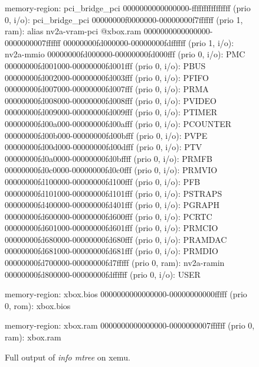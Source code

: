 \begin{figure}
\begin{minipage}{0.48\linewidth}
\begin{ffcode}
    memory-region: pci_bridge_pci
      0000000000000000-ffffffffffffffff (prio 0, i/o): pci_bridge_pci
        00000000f0000000-00000000f7ffffff (prio 1, ram): alias nv2a-vram-pci @xbox.ram 0000000000000000-0000000007ffffff
        00000000fd000000-00000000fdffffff (prio 1, i/o): nv2a-mmio
          00000000fd000000-00000000fd000fff (prio 0, i/o): PMC
          00000000fd001000-00000000fd001fff (prio 0, i/o): PBUS
          00000000fd002000-00000000fd003fff (prio 0, i/o): PFIFO
          00000000fd007000-00000000fd007fff (prio 0, i/o): PRMA
          00000000fd008000-00000000fd008fff (prio 0, i/o): PVIDEO
          00000000fd009000-00000000fd009fff (prio 0, i/o): PTIMER
          00000000fd00a000-00000000fd00afff (prio 0, i/o): PCOUNTER
          00000000fd00b000-00000000fd00bfff (prio 0, i/o): PVPE
          00000000fd00d000-00000000fd00dfff (prio 0, i/o): PTV
          00000000fd0a0000-00000000fd0bffff (prio 0, i/o): PRMFB
          00000000fd0c0000-00000000fd0c0fff (prio 0, i/o): PRMVIO
          00000000fd100000-00000000fd100fff (prio 0, i/o): PFB
          00000000fd101000-00000000fd101fff (prio 0, i/o): PSTRAPS
          00000000fd400000-00000000fd401fff (prio 0, i/o): PGRAPH
          00000000fd600000-00000000fd600fff (prio 0, i/o): PCRTC
          00000000fd601000-00000000fd601fff (prio 0, i/o): PRMCIO
          00000000fd680000-00000000fd680fff (prio 0, i/o): PRAMDAC
          00000000fd681000-00000000fd681fff (prio 0, i/o): PRMDIO
          00000000fd700000-00000000fd7fffff (prio 0, ram): nv2a-ramin
          00000000fd800000-00000000fdffffff (prio 0, i/o): USER

    memory-region: xbox.bios
      0000000000000000-00000000000fffff (prio 0, rom): xbox.bios

    memory-region: xbox.ram
      0000000000000000-0000000007ffffff (prio 0, ram): xbox.ram
    \end{ffcode}
  \end{minipage}
  \caption{Full output of \emph{info mtree} on xemu\cite{xemu}.}
  \label{fig:xemu_full}
\end{figure}